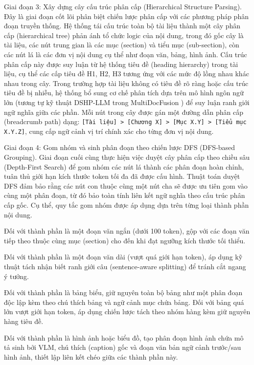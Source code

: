 \indent Giai đoạn 3: Xây dựng cây cấu trúc phân cấp (Hierarchical Structure Parsing). Đây là giai đoạn cốt lõi phân biệt chiến lược phân cấp với các phương pháp phân đoạn truyền thống. Hệ thống tái cấu trúc toàn bộ tài liệu thành một cây phân cấp (hierarchical tree) phản ánh tổ chức logic của nội dung, trong đó gốc cây là tài liệu, các nút trung gian là các mục (section) và tiểu mục (sub-section), còn các nút lá là các đơn vị nội dung cụ thể như đoạn văn, bảng, hình ảnh. Cấu trúc phân cấp này được suy luận từ hệ thống tiêu đề (heading hierarchy) trong tài liệu, cụ thể các cấp tiêu đề H1, H2, H3 tương ứng với các mức độ lồng nhau khác nhau trong cây. Trong trường hợp tài liệu không có tiêu đề rõ ràng hoặc cấu trúc tiêu đề bị nhiễu, hệ thống bổ sung cơ chế phân tích dựa trên mô hình ngôn ngữ lớn (tương tự kỹ thuật DSHP-LLM trong MultiDocFusion \cite{shin-etal-2025-multidocfusion}) để suy luận ranh giới ngữ nghĩa giữa các phần. Mỗi nút trong cây được gán một đường dẫn phân cấp (breadcrumb path) dạng: \texttt{[Tài liệu] > [Chương X] > [Mục X.Y] > [Tiểu mục X.Y.Z]}, cung cấp ngữ cảnh vị trí chính xác cho từng đơn vị nội dung.

\indent Giai đoạn 4: Gom nhóm và sinh phân đoạn theo chiến lược DFS (DFS-based Grouping). Giai đoạn cuối cùng thực hiện việc duyệt cây phân cấp theo chiều sâu (Depth-First Search) để gom nhóm các nút lá thành các phân đoạn hoàn chỉnh, tuân thủ giới hạn kích thước token tối đa đã được cấu hình. Thuật toán duyệt DFS đảm bảo rằng các nút con thuộc cùng một nút cha sẽ được ưu tiên gom vào cùng một phân đoạn, từ đó bảo toàn tính liên kết ngữ nghĩa theo cấu trúc phân cấp gốc. Cụ thể, quy tắc gom nhóm được áp dụng dựa trên từng loại thành phần nội dung.


	
Đối với thành phần là một đoạn văn ngắn (dưới 100 token), gộp với các đoạn văn tiếp theo thuộc cùng mục (section) cho đến khi đạt ngưỡng kích thước tối thiểu.

Đối với thành phần là một đoạn văn dài (vượt quá giới hạn token), áp dụng kỹ thuật tách nhận biết ranh giới câu (sentence-aware splitting) để tránh cắt ngang ý tưởng.
	
Đối với thành phần là bảng biểu, giữ nguyên toàn bộ bảng như một phân đoạn độc lập kèm theo chú thích bảng và ngữ cảnh mục chứa bảng. Đối với bảng quá lớn vượt giới hạn token, áp dụng chiến lược tách theo nhóm hàng kèm giữ nguyên hàng tiêu đề.
	
Đối với thành phần là hình ảnh hoặc biểu đồ, tạo phân đoạn hình ảnh chứa mô tả sinh bởi VLM, chú thích (caption) gốc và đoạn văn bản ngữ cảnh trước/sau hình ảnh, thiết lập liên kết chéo giữa các thành phần này.
	
